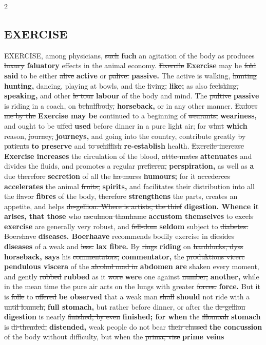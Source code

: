 \documentclass[10pt]{article}
\begin{document}
\begin{multicols}{2}
\subsection*{EXERCISE}
EXERCISE, among physicians, \sout{such} \textbf{fuch} an agitation of the body as produces \sout{luxury} \textbf{faluatory} effects in the animal economy. \sout{Exercile} \textbf{Exercise} may be \sout{fold} \textbf{said} to be either \sout{alive} \textbf{active} or \sout{palive.} \textbf{passive.} The active is walking, \sout{hunting} \textbf{hunting,} dancing, playing at bowls, and the \sout{living,} \textbf{like;} as also \sout{feelsking,} \textbf{speaking,} and other \sout{le tour} \textbf{labour} of the body and mind. The \sout{pultive} \textbf{passive} is riding in a coach, on \sout{behalfbody,} \textbf{horseback,} or in any other manner. \sout{Exdoes me by the} \textbf{Exercise may be} continued to a beginning of \sout{wearants,} \textbf{weariness,} and ought to be \sout{uifed} \textbf{used} before dinner in a pure light air; for \sout{what} \textbf{which} reason, \sout{journey,} \textbf{journeys,} and going into the country, contribute greatly \sout{by patients} \textbf{to preserve} and \sout{to schillish} \textbf{re-establish} health. \sout{Exercile increase} \textbf{Exercise increases} the circulation of the blood, \sout{attte-mates} \textbf{attenuates} and divides the fluids, and promotes a regular \sout{prefieren,} \textbf{perspiration,} as well as \textbf{a} due \sout{therefore} \textbf{secretion} of all the \sout{ha-murss} \textbf{humours;} for it \sout{accederces} \textbf{accelerates} the animal \sout{fruits,} \textbf{spirits,} and facilitates their distribution into all the \sout{flavor} \textbf{fibres} of the body, \sout{therefore} \textbf{strengthens} the parts, creates an appetite, and helps \sout{de-gellion. Where is artists, the thief} \textbf{digestion. Whence it arises, that those} who \sout{asculmon thanhame} \textbf{accustom themselves} to \sout{excels} \textbf{exercise} are generally very robust, and \sout{fell-dom} \textbf{seldom} subject to \sout{diabetes. Boershave} \textbf{diseases. Boerhaave} recommends bodily exercise in \sout{diesides} \textbf{diseases} of a weak and \sout{less.} \textbf{lax fibre.} By \sout{rings} \textbf{riding} on \sout{hardducks, dyss} \textbf{horseback, says} his \sout{commentators,} \textbf{commentator,} the \sout{produktions vicerc} \textbf{pendulous viscera} of the \sout{alcohol mad in} \textbf{abdomen are} shaken every moment, and gently \sout{robbed} \textbf{rubbed} as it \sout{wore} \textbf{were} one against \sout{number,} \textbf{another,} while in the mean time the pure air acts on the lungs with greater \sout{forces.} \textbf{force.} But it is \sout{folle} to \sout{offered} \textbf{be observed} that a weak man \sout{shall} \textbf{should} not ride with a \sout{until lomach,} \textbf{full stomach,} but rather before dinner, or after the \sout{de-gellion} \textbf{digestion} is nearly \sout{finished, by even} \textbf{finished; for when} the \sout{illomoah} \textbf{stomach} is \sout{di-thended,} \textbf{distended,} weak people do not bear \sout{their classed} \textbf{the concussion} of the body without difficulty, but when the \sout{prima, vise} \textbf{prime veins} 
\end{multicols}
\end{document}
